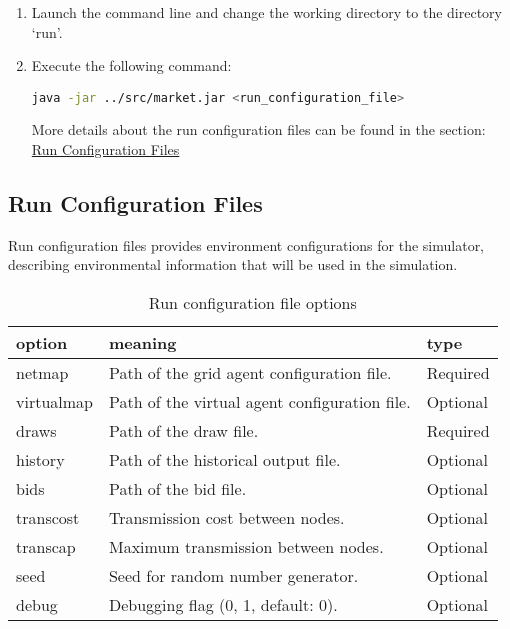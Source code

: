 \documentclass[12pt]{article}
\begin{document}
\begin{enumerate}
    \item{Launch the command line and change the working directory to the directory `run'.}
    \item{Execute the following command: }
        \begin{center}
            \lstinline[language=bash]!java -jar ../src/market.jar <run_configuration_file>!
        \end{center}
        More details about the run configuration files can be found in the section: 
        \hyperref[subsec:running_runconfig]{Run Configuration Files}
\end{enumerate}

\subsection{Run Configuration Files}
\label{subsec:running_runconfig}

Run configuration files provides environment configurations for the simulator, 
describing environmental information that will be used in the simulation. 

\begin{table}[H]
    \caption{Run configuration file options}
    \begin{center}
        \begin{tabular} {| l | l | l |}
            \hline
            \textbf{option} & \textbf{meaning} & \textbf{type} \\ \hline
            netmap & Path of the grid agent configuration file. & Required \\ \hline
            virtualmap & Path of the virtual agent configuration file. & Optional \\ \hline
            draws & Path of the draw file. & Required \\ \hline
            history & Path of the historical output file. & Optional \\ \hline
            bids & Path of the bid file. & Optional \\ \hline
            transcost & Transmission cost between nodes. & Optional \\ \hline
            transcap & Maximum transmission between nodes. & Optional \\ \hline
            seed & Seed for random number generator. & Optional \\ \hline
            debug & Debugging flag (0, 1, default: 0). & Optional \\ \hline
        \end{tabular}
    \end{center}
\end{table}
\end{document}
